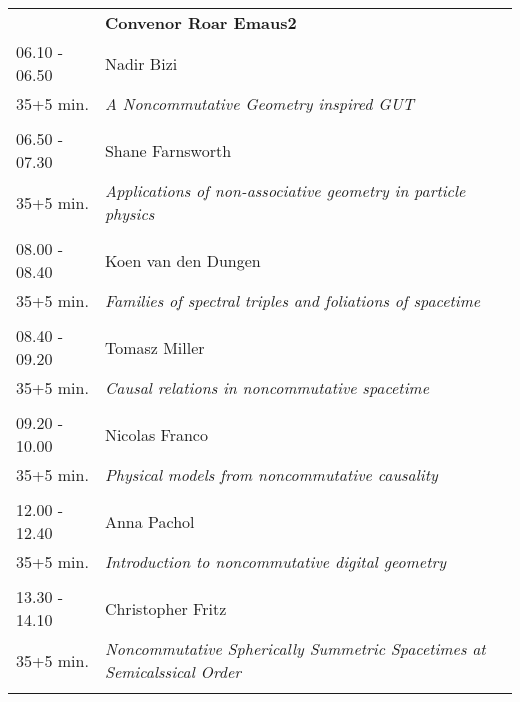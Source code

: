 \begin{longtable}{p{3cm}p{13cm}}
&\hfill {\bf Convenor Roar Emaus2 }\\ 
06.10 - 06.50 & Nadir Bizi\\ 
35+5 min. & {\it A Noncommutative Geometry inspired GUT}\\ 
 & \\ 
06.50 - 07.30 & Shane Farnsworth\\ 
35+5 min. & {\it Applications of non-associative geometry in particle physics}\\ 
 & \\ 
08.00 - 08.40 & Koen van den Dungen\\ 
35+5 min. & {\it Families of spectral triples and foliations of spacetime}\\ 
 & \\ 
08.40 - 09.20 & Tomasz Miller\\ 
35+5 min. & {\it Causal relations in noncommutative spacetime}\\ 
 & \\ 
09.20 - 10.00 & Nicolas Franco\\ 
35+5 min. & {\it Physical models from noncommutative causality}\\ 
 & \\ 
12.00 - 12.40 & Anna Pachol\\ 
35+5 min. & {\it Introduction to noncommutative digital geometry}\\ 
 & \\ 
13.30 - 14.10 & Christopher Fritz\\ 
35+5 min. & {\it Noncommutative Spherically Summetric Spacetimes at Semicalssical Order}\\ 
 & \\ 
\end{longtable}


